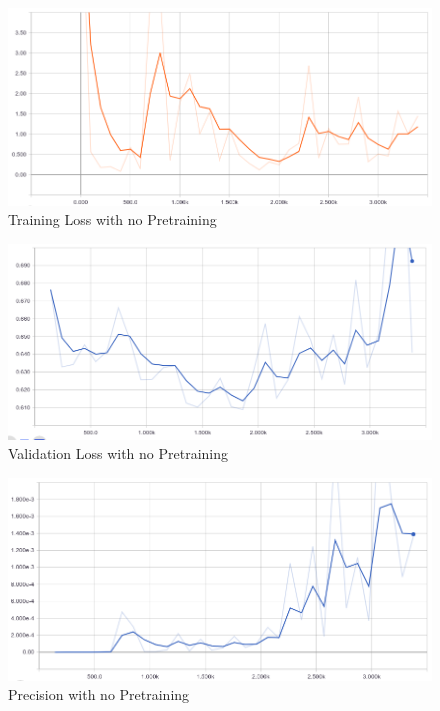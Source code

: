 \documentclass[12pt]{report}
\begin{document}
\vspace{0.5cm}
\begin{figure}[ht!]
	\centering
	\includegraphics[width=15cm]{no-ckpt-loss}
	\caption{Training Loss with no Pretraining}
	\label{fig:no-ckpt-loss}
\end{figure}

\vspace{0.5cm}
\begin{figure}[ht!]
	\centering
	\includegraphics[width=15cm]{no-ckpt-val-loss}
	\caption{Validation Loss with no Pretraining}
	\label{fig:no-ckpt-val-loss}
\end{figure}

\vspace{0.5cm}
\begin{figure}[ht!]
	\centering
	\includegraphics[width=15cm]{no-ckpt-precision}
	\caption{Precision with no Pretraining}
	\label{fig:no-ckpt-precision}
\end{figure}
\end{document}

